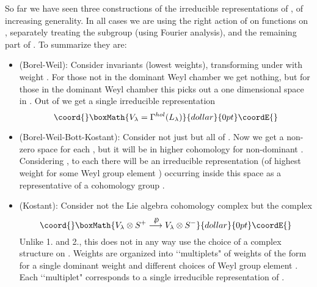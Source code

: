 \documentclass[a4paper,a4paper]{article}
\theoremstyle{conjecture}
\def\Slash#1{#1\!\!\!\!/}
\def\Dirac{\Slash D}
\begin{document}
So far we have seen three constructions of the irreducible representations of
\coordHE{}, of increasing generality.  In all cases we are using the
right action of \coordHE{} on functions on \coordHE{}, separately treating the \coordHE{} subgroup (using
Fourier analysis), and the remaining \coordHE{} part of \coordHE{}.
To summarize they are:
\begin{itemize}

\item (Borel-Weil):  Consider \coordHE{} invariants (lowest weights), transforming
under \coordHE{} with weight \myHighlight{$-\lambda$}\coordHE{}. For those \myHighlight{$\lambda$}\coordHE{} not in the dominant Weyl
chamber we get nothing, but for those in the dominant Weyl chamber this picks
out a one dimensional space in \coordHE{}.  Out of \coordHE{} we get a single irreducible
representation
$$\coord{}\boxMath{V_\lambda=\Gamma^{hol}(L_\lambda)}{dollar}{0pt}\coordE{}$$

\item (Borel-Weil-Bott-Kostant):  Consider not just \coordHE{} but
all of \coordHE{}.  Now we get a non-zero space
for each \myHighlight{$\lambda$}\coordHE{}, but it will be in higher cohomology for
non-dominant \myHighlight{$\lambda$}\coordHE{}. Considering \coordHE{}, to each \myHighlight{$\lambda$}\coordHE{} there will be an
irreducible representation (of highest weight \coordHE{} for some Weyl group element \coordHE{}) occurring inside
this space as a representative of a cohomology group
\coordHE{}.

\item (Kostant): Consider not the Lie algebra cohomology complex
\coordHE{} but the complex
$$\coord{}\boxMath{V_\lambda\otimes S^+\stackrel{\Dirac}\longrightarrow V_\lambda\otimes S^-}{dollar}{0pt}\coordE{}$$
Unlike 1. and 2., this does not in any way use the choice of a complex
structure on \coordHE{}.  Weights are
organized into \lq\lq multiplets" of weights of
the form \coordHE{} for a single dominant weight \myHighlight{$\lambda$}\coordHE{} and
different choices of Weyl group element \coordHE{}.  Each \lq\lq multiplet" corresponds
to a single irreducible representation of \coordHE{}.

\end{itemize}
\end{document}
